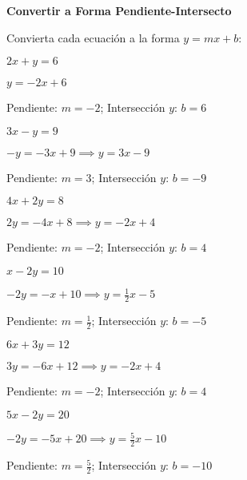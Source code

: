 \begin{exercise}
\textbf{Convertir a Forma Pendiente-Intersecto}

Convierta cada ecuación a la forma $y = mx + b$:

\problem $2x + y = 6$

\begin{solucion}
$y = -2x + 6$

Pendiente: $m = -2$; Intersección $y$: $b = 6$
\end{solucion}

\problem $3x - y = 9$

\begin{solucion}
$-y = -3x + 9 \implies y = 3x - 9$

Pendiente: $m = 3$; Intersección $y$: $b = -9$
\end{solucion}

\problem $4x + 2y = 8$

\begin{solucion}
$2y = -4x + 8 \implies y = -2x + 4$

Pendiente: $m = -2$; Intersección $y$: $b = 4$
\end{solucion}

\problem $x - 2y = 10$

\begin{solucion}
$-2y = -x + 10 \implies y = \frac{1}{2}x - 5$

Pendiente: $m = \frac{1}{2}$; Intersección $y$: $b = -5$
\end{solucion}

\problem $6x + 3y = 12$

\begin{solucion}
$3y = -6x + 12 \implies y = -2x + 4$

Pendiente: $m = -2$; Intersección $y$: $b = 4$
\end{solucion}

\problem $5x - 2y = 20$

\begin{solucion}
$-2y = -5x + 20 \implies y = \frac{5}{2}x - 10$

Pendiente: $m = \frac{5}{2}$; Intersección $y$: $b = -10$
\end{solucion}
\end{exercise}

